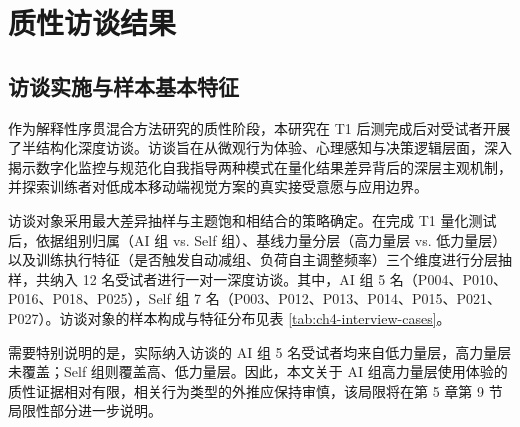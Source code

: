 \documentclass[UTF8,zihao=-4,twoside,openany]{ctexbook}
\begin{document}
\section{质性访谈结果}

\subsection{访谈实施与样本基本特征}
作为解释性序贯混合方法研究的质性阶段，本研究在 T1 后测完成后对受试者开展了半结构化深度访谈。访谈旨在从微观行为体验、心理感知与决策逻辑层面，深入揭示数字化监控与规范化自我指导两种模式在量化结果差异背后的深层主观机制，并探索训练者对低成本移动端视觉方案的真实接受意愿与应用边界。

访谈对象采用最大差异抽样与主题饱和相结合的策略确定。在完成 T1 量化测试后，依据组别归属（AI 组 vs. Self 组）、基线力量分层（高力量层 vs. 低力量层）以及训练执行特征（是否触发自动减组、负荷自主调整频率）三个维度进行分层抽样，共纳入 12 名受试者进行一对一深度访谈。其中，AI 组 5 名（P004、P010、P016、P018、P025），Self 组 7 名（P003、P012、P013、P014、P015、P021、P027）。访谈对象的样本构成与特征分布见表 \ref{tab:ch4-interview-cases}。

需要特别说明的是，实际纳入访谈的 AI 组 5 名受试者均来自低力量层，高力量层未覆盖；Self 组则覆盖高、低力量层。因此，本文关于 AI 组高力量层使用体验的质性证据相对有限，相关行为类型的外推应保持审慎，该局限将在第 5 章第 9 节局限性部分进一步说明。
\end{document}
